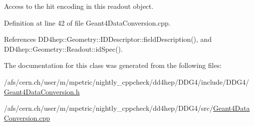 Access to the hit encoding in this readout object. 



Definition at line 42 of file Geant4\+Data\+Conversion.\+cpp.



References D\+D4hep\+::\+Geometry\+::\+I\+D\+Descriptor\+::field\+Description(), and D\+D4hep\+::\+Geometry\+::\+Readout\+::id\+Spec().



The documentation for this class was generated from the following files\+:\begin{DoxyCompactItemize}
\item 
/afs/cern.\+ch/user/m/mpetric/nightly\+\_\+cppcheck/dd4hep/\+D\+D\+G4/include/\+D\+D\+G4/\hyperlink{_geant4_data_conversion_8h}{Geant4\+Data\+Conversion.\+h}\item 
/afs/cern.\+ch/user/m/mpetric/nightly\+\_\+cppcheck/dd4hep/\+D\+D\+G4/src/\hyperlink{_geant4_data_conversion_8cpp}{Geant4\+Data\+Conversion.\+cpp}\end{DoxyCompactItemize}
